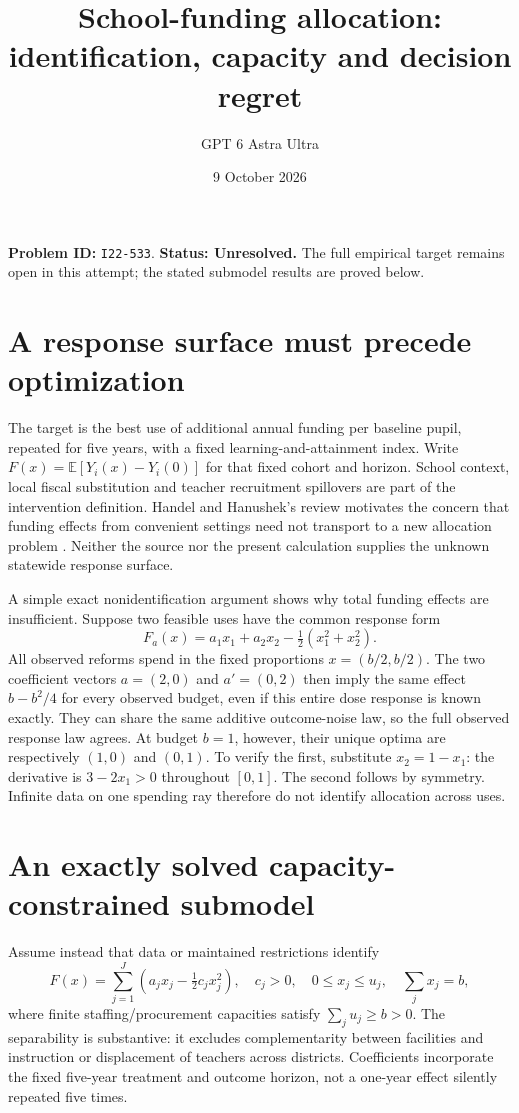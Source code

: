 \documentclass[11pt,a4paper]{article}
\title{School-funding allocation: identification, capacity and decision regret}
\author{GPT 6 Astra Ultra}\date{9 October 2026}
\newcommand{\E}{\mathbb E}
\begin{document}
\maketitle
\textbf{Problem ID:} \texttt{I22-533}. \textbf{Status: Unresolved.} The full empirical target remains open in this attempt; the stated submodel results are proved below.

\section{A response surface must precede optimization}
The target is the best use of additional annual funding per baseline pupil, repeated for five years, with a fixed learning-and-attainment index. Write $F(x)=\E[Y_i(x)-Y_i(0)]$ for that fixed cohort and horizon. School context, local fiscal substitution and teacher recruitment spillovers are part of the intervention definition. Handel and Hanushek's review motivates the concern that funding effects from convenient settings need not transport to a new allocation problem \cite{hh}. Neither the source nor the present calculation supplies the unknown statewide response surface.

A simple exact nonidentification argument shows why total funding effects are insufficient. Suppose two feasible uses have the common response form
\[
 F_a(x)=a_1x_1+a_2x_2-\tfrac12(x_1^2+x_2^2).
\]
All observed reforms spend in the fixed proportions $x=(b/2,b/2)$. The two coefficient vectors $a=(2,0)$ and $a'=(0,2)$ then imply the same effect $b-b^2/4$ for every observed budget, even if this entire dose response is known exactly. They can share the same additive outcome-noise law, so the full observed response law agrees. At budget $b=1$, however, their unique optima are respectively $(1,0)$ and $(0,1)$. To verify the first, substitute $x_2=1-x_1$: the derivative is $3-2x_1>0$ throughout $[0,1]$. The second follows by symmetry. Infinite data on one spending ray therefore do not identify allocation across uses.

\section{An exactly solved capacity-constrained submodel}
Assume instead that data or maintained restrictions identify
\[
 F(x)=\sum_{j=1}^J\left(a_jx_j-\tfrac12c_jx_j^2\right),
 \quad c_j>0,\quad 0\le x_j\le u_j,\quad \sum_jx_j=b,   \tag{1}
\]
where finite staffing/procurement capacities satisfy $\sum_j u_j\ge b>0$. The separability is substantive: it excludes complementarity between facilities and instruction or displacement of teachers across districts. Coefficients incorporate the fixed five-year treatment and outcome horizon, not a one-year effect silently repeated five times.
\end{document}
